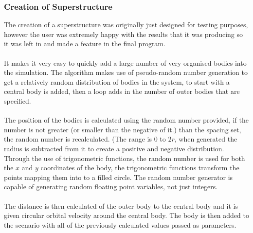 \subsubsection{Creation of Superstructure}
The creation of a superstructure was originally just designed for testing purposes, however the user was extremely happy with the results that it was producing so it was left in and made a feature in the final program.

\paragraph{}
It makes it very easy to quickly add a large number of very organised bodies into the simulation. The algorithm makes use of pseudo-random number generation to get a relatively random distribution of bodies in the system, to start with a central body is added, then a loop adds in the number of outer bodies that are specified.

\paragraph{}
The position of the bodies is calculated using the random number provided, if the number is not greater (or smaller than the negative of it.) than the spacing set, the random number is recalculated. (The range is 0 to $2r$, when generated the radius is subtracted from it to create a positive and negative distribution. Through the use of trigonometric functions, the random number is used for both the $x$ and $y$ coordinates of the body, the trigonometric functions transform the points mapping them into to a filled circle. The random number generator is capable of generating random floating point variables, not just integers.

\paragraph{}
The distance is then calculated of the outer body to the central body and it is given circular orbital velocity around the central body. The body is then added to the scenario with all of the previously calculated values passed as parameters.

